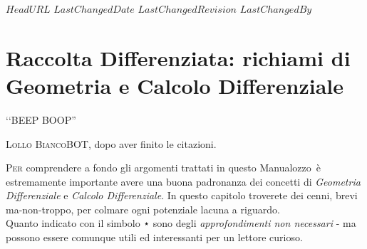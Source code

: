 \svnidlong
{$HeadURL$}
{$LastChangedDate$}
{$LastChangedRevision$}
{$LastChangedBy$}

\chapter{Raccolta Differenziata: richiami di Geometria e Calcolo Differenziale}
\begin{introduction}
	‘‘BEEP BOOP''
	\begin{flushright}
		\textsc{Lollo BiancoBOT}, dopo aver finito le citazioni.%
	\end{flushright}
\end{introduction}
\lettrine[findent=1pt, nindent=0pt]{P}{er} comprendere a fondo gli argomenti trattati in questo Manualozzo\texttrademark\ è estremamente importante avere una buona padronanza dei concetti di \textit{Geometria Differenziale} e \textit{Calcolo Differenziale}. In questo capitolo troverete dei cenni, brevi ma-non-troppo, per colmare ogni potenziale lacuna a riguardo.\\
Quanto indicato con il simbolo ⋆ sono degli \textit{approfondimenti non necessari} - ma possono essere comunque utili ed interessanti per un lettore curioso.
